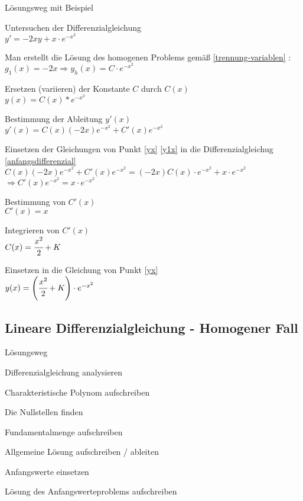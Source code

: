\documentclass[german]{latex4ei/latex4ei_sheet}
\begin{document}
\begin{sectionbox}

\begin{cookbox}{Lösungsweg mit Beispiel}
    \item\label{anfangsdifferenzial} Untersuchen der Differenzialgleichung \\
        $y' = -2xy + x \cdot e^{-x^2}$
    \item Man erstellt die Lösung des homogenen Problems gemäß \ref{trennung-variablen} :\\
        $g_1(x) = -2x \Rightarrow y_h(x) = C \cdot e^{-x^2} $
    \item\label{yx} Ersetzen (variieren) der Konstante $C$ durch $C(x)$ \\
        $y(x) = C(x) * e^{-x^2}$
    \item\label{y1x} Bestimmung der Ableitung $y'(x)$ \\
        $y'(x) = C(x)(-2x)e^{-x^2} + C'(x) e^{-x^2}$
    \item Einsetzen der Gleichungen von Punkt \ref{yx} \ref{y1x} in die Differenzialgleichug \ref{anfangsdifferenzial} \\
        $C(x)(-2x)e^{-x^2} + C'(x)e^{-x^2} = (-2x)C(x)\cdot e^{-x^2} + x \cdot e^{-x^2}$\\
        $\Rightarrow C'(x)e^{-x^2} = x \cdot e^{-x^2}$
    \item Bestimmung von $C'(x)$ \\ $C'(x) = x$
    \item Integrieren von $C'(x)$ \\
        $C(x) = \cfrac{x^2}{2} + K$
    \item Einsetzen in die Gleichung von Punkt \ref{yx} \\
        $y(x) = \left( \cfrac{x^2}{2} + K \right) \cdot e^{-x^2}$
\end{cookbox}

\subsection{Lineare Differenzialgleichung - Homogener Fall}

\begin{cookbox}{Lösungsweg}
    \item Differenzialgleichung analysieren
    \item Charakteristische Polynom aufschreiben
    \item Die Nullstellen finden
    \item Fundamentalmenge aufschreiben
    \item Allgemeine Lösung aufschreiben / ableiten
    \item Anfangswerte einsetzen
    \item Lösung des Anfangswerteproblems aufschreiben
\end{cookbox}



\end{sectionbox}
\end{document}
